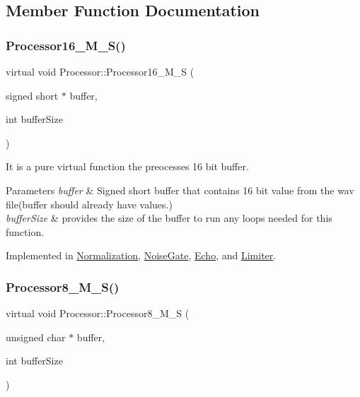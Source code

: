 \subsection{Member Function Documentation}
\mbox{\label{classProcessor_a2a0903d1ca9e627e8a45e5159ecc0505}} 
\subsubsection{\texorpdfstring{Processor16\+\_\+\+M\+\_\+\+S()}{Processor16\_M\_S()}}
{\footnotesize\ttfamily virtual void Processor\+::\+Processor16\+\_\+\+M\+\_\+S (\begin{DoxyParamCaption}\item[{signed short $\ast$}]{buffer,  }\item[{int}]{buffer\+Size }\end{DoxyParamCaption})\hspace{0.3cm}{\ttfamily [pure virtual]}}



It is a pure virtual function the preocesses 16 bit buffer. 


\begin{DoxyParams}{Parameters}
{\em buffer} & Signed short buffer that contains 16 bit value from the wav file(buffer should already have values.) \\
\hline
{\em buffer\+Size} & provides the size of the buffer to run any loops needed for this function. \\
\hline
\end{DoxyParams}


Implemented in \hyperlink{classNormalization_a9e20f1881043dbce47e11ebdca6689ca}{Normalization}, \hyperlink{classNoiseGate_a8e1f9ab7c18b029fdae17ec621ac91d0}{Noise\+Gate}, \hyperlink{classEcho_ad68f1fabcbac2646c70aded5904b3a2c}{Echo}, and \hyperlink{classLimiter_ab81f92ad3d76078c424c2f4a8f518ba9}{Limiter}.

\mbox{\label{classProcessor_a5a977cc3596fdeac860d5e28a99806a1}} 
\subsubsection{\texorpdfstring{Processor8\+\_\+\+M\+\_\+\+S()}{Processor8\_M\_S()}}
{\footnotesize\ttfamily virtual void Processor\+::\+Processor8\+\_\+\+M\+\_\+S (\begin{DoxyParamCaption}\item[{unsigned char $\ast$}]{buffer,  }\item[{int}]{buffer\+Size }\end{DoxyParamCaption})\hspace{0.3cm}{\ttfamily [pure virtual]}}



